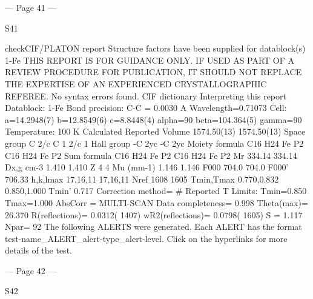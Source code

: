 --- Page 41 ---
 
 
S41 
 
 
 
checkCIF/PLATON report 
Structure factors have been supplied for datablock(s) 1-Fe
THIS REPORT IS FOR GUIDANCE ONLY. IF USED AS PART OF A REVIEW PROCEDURE
FOR PUBLICATION, IT SHOULD NOT REPLACE THE EXPERTISE OF AN EXPERIENCED
CRYSTALLOGRAPHIC REFEREE.
No syntax errors found.        CIF dictionary        Interpreting this report
Datablock: 1-Fe 
Bond precision:
C-C = 0.0030 A
Wavelength=0.71073
Cell:
a=14.2948(7)
b=12.8549(6)
c=8.8448(4)
alpha=90
beta=104.364(5)
gamma=90
Temperature: 
100 K
Calculated
Reported
Volume
1574.50(13)
1574.50(13)
Space group
C 2/c 
C 1 2/c 1 
Hall group
-C 2yc 
-C 2yc 
Moiety formula
C16 H24 Fe P2
C16 H24 Fe P2
Sum formula
C16 H24 Fe P2
C16 H24 Fe P2
Mr
334.14
334.14
Dx,g cm-3
1.410
1.410
Z
4
4
Mu (mm-1)
1.146
1.146
F000
704.0
704.0
F000’
706.33
h,k,lmax
17,16,11
17,16,11
Nref
1608 
1605 
Tmin,Tmax
0.770,0.832
0.850,1.000
Tmin’
0.717
Correction method= # Reported T Limits: Tmin=0.850 Tmax=1.000
AbsCorr = MULTI-SCAN
Data completeness= 0.998
Theta(max)= 26.370
R(reflections)= 0.0312( 1407)
wR2(reflections)= 0.0798( 1605)
S = 1.117
Npar= 92
The following ALERTS were generated. Each ALERT has the format
       test-name_ALERT_alert-type_alert-level.
Click on the hyperlinks for more details of the test.


--- Page 42 ---
 
 
S42 
 
 
 

